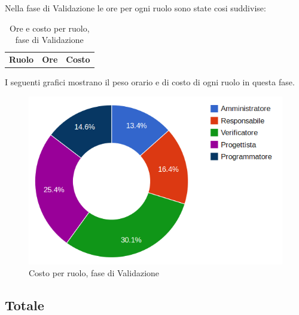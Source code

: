 Nella fase di Validazione le ore per ogni ruolo sono state cosi suddivise:

\begin{table}[H]
	\centering
	\begin{tabular}{ l c c }
	\textbf{Ruolo} & \textbf{Ore} & \textbf{Costo} \\
	
		
	
	\end{tabular}
	\caption{Ore e costo per ruolo, fase di Validazione}
	\end{table}

I seguenti grafici mostrano il peso orario e di costo di ogni ruolo in questa fase.

\begin{tikzpicture}

	

\end{tikzpicture}


\begin{figure}[H]
\centering
\includegraphics[scale=0.35]{5-4-2.png}
\caption{Costo per ruolo, fase di Validazione\label{fig:nome}}
\end{figure}

\subsection{Totale}

